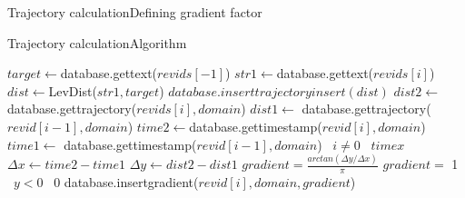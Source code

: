\documentclass[t]{beamer}
\newcommand{\LineIf}[3]{ {#1}
   \algorithmicif\ {#2}
   \algorithmicelse\ {#3} } %
\begin{document}
  \begin{frame}{Trajectory calculation}{Defining gradient factor}
      \pgfplotsset{width=0.8\linewidth}

  \end{frame}

  \begin{frame}{Trajectory calculation}{Algorithm}
      \begin{algorithmic}
        \tiny
        \State $target \gets $database.gettext($revids[-1]$)
        \State $str1 \gets $database.gettext($revids[i]$)
        \State $dist \gets $LevDist($str1, target$)
        \State $database.inserttrajectoryinsert(dist)$    
        \EndIf
        \EndFor
        \State $dist2 \gets $database.gettrajectory($revids[i],domain$)
        \State $dist1 \gets$ database.gettrajectory($revid[i-1],domain$)
        \State $time2 \gets $database.gettimestamp($revid[i],domain$)
        \State $time1 \gets $
        \LineIf{database.gettimestamp($revid[i-1],domain$)}{$i \neq 0$}{$timex$} 
        \State ${\Delta}x \gets time2 - time1$
        \State ${\Delta}y \gets dist2 - dist1$
        \State $gradient = \frac{arctan({\Delta}y/{\Delta}x)}{\pi}$ 
        \State $gradient = $\LineIf{1}{$y < 0$}{0}
        \EndIf
        \State database.insertgradient($revid[i],domain,gradient$)
        \EndFor
        \EndProcedure
      \end{algorithmic}
  \end{frame}
\end{document}
